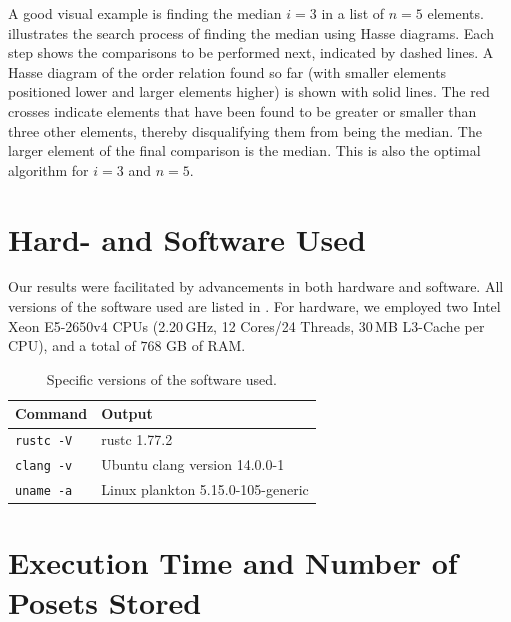 \documentclass[a4paper,UKenglish,cleveref, autoref, thm-restate, anonymous]{lipics-v2021}
\begin{document}
A good visual example is finding the median $i = 3$ in a list of $n = 5$ elements.
 illustrates the search process of finding the median using Hasse diagrams.
Each step shows the comparisons to be performed next, indicated by dashed lines.
A Hasse diagram of the order relation found so far (with smaller elements positioned lower and larger elements higher) is shown with solid lines.
The red crosses indicate elements that have been found to be greater or smaller than three other elements, thereby disqualifying them from being the median.
The larger element of the final comparison is the median.
This is also the optimal algorithm for $i = 3$ and $n = 5$.


\section{Hard- and Software Used} \label{sec:hardware}

Our results were facilitated by advancements in both hardware and software.
All versions of the software used are listed in .
For hardware, we employed two Intel Xeon E5-2650v4 CPUs (2.20\,GHz, 12 Cores/24 Threads, 30\,MB L3-Cache per CPU), and a total of $768$ GB of RAM.

\begin{table}[!t]
  \renewcommand{\arraystretch}{1.1}
  \caption{Specific versions of the software used.}
  \label{table:command_outputs}
  \centering
  \small
  \begin{tabular}{l|l}
    \textbf{Command}  & \textbf{Output}                   \\ \hline
    \texttt{rustc -V} & rustc 1.77.2                      \\ \hline
    \texttt{clang -v} & Ubuntu clang version 14.0.0-1     \\ \hline
    \texttt{uname -a} & Linux plankton 5.15.0-105-generic \\
  \end{tabular}
\end{table}



\section{Execution Time and Number of Posets Stored}
\end{document}
